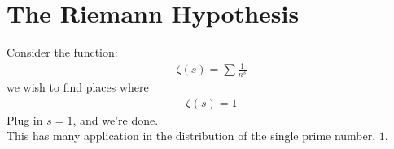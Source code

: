 \setcounter{section}{0}

\section{The Riemann Hypothesis}
Consider the function:
\begin{align*}
  \zeta(s) = \sum \frac{1}{n^s}
\end{align*}
we wish to find places where 
\begin{align*}
  \zeta(s) = 1
\end{align*}
Plug in $s=1$, and we're done.\\

This has many application in 
the distribution of the single 
prime number, $1$.
